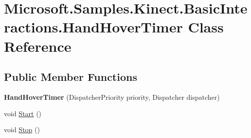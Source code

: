 \hypertarget{class_microsoft_1_1_samples_1_1_kinect_1_1_basic_interactions_1_1_hand_hover_timer}{\section{Microsoft.\-Samples.\-Kinect.\-Basic\-Interactions.\-Hand\-Hover\-Timer Class Reference}
\label{class_microsoft_1_1_samples_1_1_kinect_1_1_basic_interactions_1_1_hand_hover_timer}
}
\subsection*{Public Member Functions}
\begin{DoxyCompactItemize}
\item 
\hypertarget{class_microsoft_1_1_samples_1_1_kinect_1_1_basic_interactions_1_1_hand_hover_timer_af580c73d62e52ea524a2b73557e69b64}{{\bfseries Hand\-Hover\-Timer} (Dispatcher\-Priority priority, Dispatcher dispatcher)}\label{class_microsoft_1_1_samples_1_1_kinect_1_1_basic_interactions_1_1_hand_hover_timer_af580c73d62e52ea524a2b73557e69b64}

\item 
void \hyperlink{class_microsoft_1_1_samples_1_1_kinect_1_1_basic_interactions_1_1_hand_hover_timer_a6d0adce0534a5fdde9a89dc9a90d1780}{Start} ()
\item 
void \hyperlink{class_microsoft_1_1_samples_1_1_kinect_1_1_basic_interactions_1_1_hand_hover_timer_a02809dd1ac714bef030824bc76b5dfe5}{Stop} ()
\end{DoxyCompactItemize}
